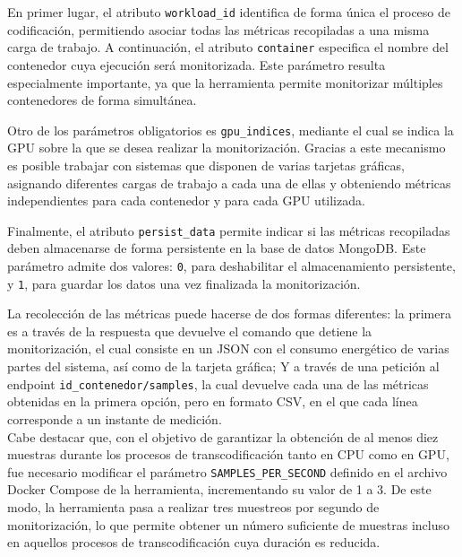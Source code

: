  En primer lugar, el atributo \texttt{workload\_id} identifica de forma única el proceso de codificación, permitiendo asociar todas las métricas recopiladas a una misma carga de trabajo. A continuación, el atributo \texttt{container} especifica el nombre del contenedor cuya ejecución será monitorizada. Este parámetro resulta especialmente importante, ya que la herramienta permite monitorizar múltiples contenedores de forma simultánea.

 

 Otro de los parámetros obligatorios es \texttt{gpu\_indices}, mediante el cual se indica la GPU sobre la que se desea realizar la monitorización. Gracias a este mecanismo es posible trabajar con sistemas que disponen de varias tarjetas gráficas, asignando diferentes cargas de trabajo a cada una de ellas y obteniendo métricas independientes para cada contenedor y para cada GPU utilizada.

 

 Finalmente, el atributo \texttt{persist\_data} permite indicar si las métricas recopiladas deben almacenarse de forma persistente en la base de datos MongoDB. Este parámetro admite dos valores: \texttt{0}, para deshabilitar el almacenamiento persistente, y \texttt{1}, para guardar los datos una vez finalizada la monitorización.

 La recolección de las métricas puede hacerse de dos formas diferentes: la primera es a través de la respuesta que devuelve el comando que detiene la monitorización, el cual consiste en un JSON con el consumo energético de varias partes del sistema, así como de la tarjeta gráfica; Y a través de una petición al endpoint \texttt{id\_contenedor/samples}, la cual devuelve cada una de las métricas obtenidas en la primera opción, pero en formato CSV, en el que cada línea corresponde a un instante de medición. \\ 

 Cabe destacar que, con el objetivo de garantizar la obtención de al menos diez muestras durante los procesos de transcodificación tanto en CPU como en GPU, fue necesario modificar el parámetro \texttt{SAMPLES\_PER\_SECOND} definido en el archivo Docker Compose de la herramienta, incrementando su valor de 1 a 3. De este modo, la herramienta pasa a realizar tres muestreos por segundo de monitorización, lo que permite obtener un número suficiente de muestras incluso en aquellos procesos de transcodificación cuya duración es reducida.

 

